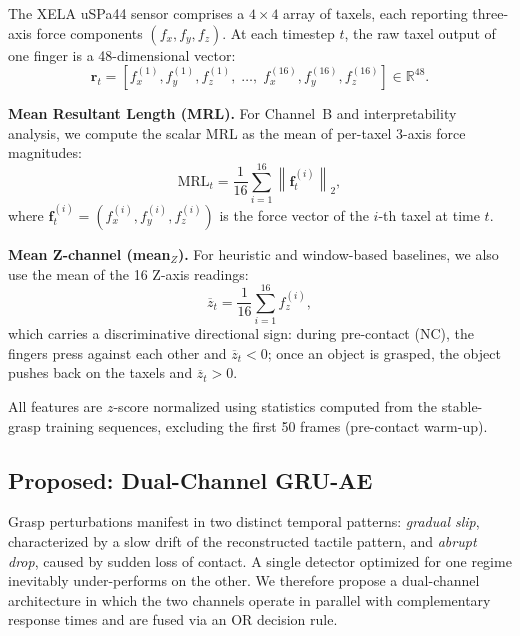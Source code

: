 \documentclass[pdflatex,sn-mathphys-num]{sn-jnl}%
\theoremstyle{thmstyleone}%
\theoremstyle{thmstyletwo}%
\theoremstyle{thmstylethree}%
\begin{document}
The XELA uSPa44 sensor comprises a $4 \times 4$ array of taxels, each reporting three-axis force components $(f_x, f_y, f_z)$. At each timestep $t$, the raw taxel output of one finger is a 48-dimensional vector:
\begin{equation}
    \mathbf{r}_t = [f_x^{(1)}, f_y^{(1)}, f_z^{(1)},\; \ldots,\; f_x^{(16)}, f_y^{(16)}, f_z^{(16)}] \in \mathbb{R}^{48}.
    \label{eq:raw}
\end{equation}

\noindent\textbf{Mean Resultant Length (MRL).}
For Channel~B and interpretability analysis, we compute the scalar MRL as the mean of per-taxel 3-axis force magnitudes:
\begin{equation}
    \mathrm{MRL}_t = \frac{1}{16} \sum_{i=1}^{16} \left\| \mathbf{f}^{(i)}_t \right\|_2,
    \label{eq:mrl}
\end{equation}
where $\mathbf{f}^{(i)}_t = (f_x^{(i)}, f_y^{(i)}, f_z^{(i)})$ is the force vector of the $i$-th taxel at time $t$.

\noindent\textbf{Mean Z-channel (mean$_Z$).}
For heuristic and window-based baselines, we also use the mean of the 16 Z-axis readings:
\begin{equation}
    \overline{z}_t = \frac{1}{16} \sum_{i=1}^{16} f_z^{(i)},
    \label{eq:meanz}
\end{equation}
which carries a discriminative directional sign: during pre-contact (NC), the fingers press against each other and $\overline{z}_t < 0$; once an object is grasped, the object pushes back on the taxels and $\overline{z}_t > 0$.

All features are $z$-score normalized using statistics computed from the stable-grasp training sequences, excluding the first 50 frames (pre-contact warm-up).

\subsection{Proposed: Dual-Channel GRU-AE}
\label{sec:dual_channel}

Grasp perturbations manifest in two distinct temporal patterns: \emph{gradual slip}, characterized by a slow drift of the reconstructed tactile pattern, and \emph{abrupt drop}, caused by sudden loss of contact. A single detector optimized for one regime inevitably under-performs on the other. We therefore propose a dual-channel architecture in which the two channels operate in parallel with complementary response times and are fused via an OR decision rule.
\end{document}

